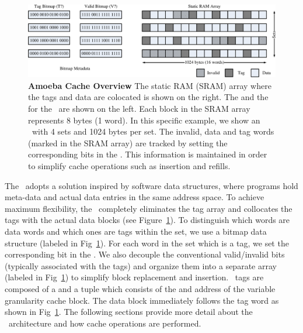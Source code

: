 \begin{figure}[h]
  \begin{center}
    \includegraphics[width=\textwidth]{files/Figures/06-AmoebaCacheArch.pdf}
    \caption[Amoeba Cache Overview]{\textbf{Amoeba Cache Overview} The static RAM (SRAM) array where the tags and data are colocated is shown on the right. The  and the  for the \AC\ are shown on the left. Each block in the SRAM array represents 8 bytes (1 word). In this specific example, we show an \AC\ with 4 sets and 1024 bytes per set. The invalid, data and tag words (marked in the SRAM array) are tracked by setting the corresponding bits in the . This information is maintained in order to simplify cache operations such as insertion and refills. }
    \label{fig:amoeba_cache_arch}
  \end{center}
\end{figure}

The \AC\ adopts a solution inspired by software data structures, where programs hold meta-data and actual data entries in the same address space. To achieve maximum flexibility, the \AC\ completely eliminates the tag array and collocates the tags with the actual data blocks (see Figure~\ref{fig:amoeba_cache_arch}). To distinguish which words are data words and which ones are tags within the set, we use a bitmap data structure (labeled  in Fig~\ref{fig:amoeba_cache_arch}). For each word in the set which is a tag, we set the corresponding bit in the . We also decouple the conventional valid/invalid bits (typically associated with the tags) and organize them into a separate array (labeled  in Fig~\ref{fig:amoeba_cache_arch}) to simplify block replacement and insertion. \AC\ tags are composed of a  and a tuple which consists of the  and  address of the variable granularity cache block. The data block immediately follows the tag word as shown in Fig~\ref{fig:amoeba_cache_arch}. The following sections provide more detail about the \AC\ architecture and how cache operations are performed.


